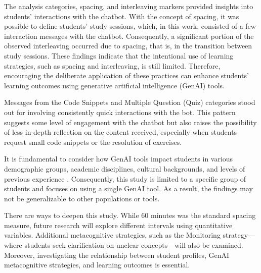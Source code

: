 \documentclass[a4paper,twoside]{article}
\begin{document}
The analysis categories, spacing, and interleaving markers provided insights
into students' interactions with the chatbot. With the concept of spacing, it
was possible to define students' study sessions, which, in this work, consisted
of a few interaction messages with the chatbot. Consequently, a significant
portion of the observed interleaving occurred due to spacing, that is, in the
transition between study sessions. These findings indicate that the intentional
use of learning strategies, such as spacing and interleaving, is still limited.
Therefore, encouraging the deliberate application of these practices can enhance
students' learning outcomes using generative artificial intelligence (GenAI)
tools.

Messages from the Code Snippets and Multiple Question (Quiz) categories stood
out for involving consistently quick interactions with the bot. This pattern
suggests some level of engagement with the chatbot but also raises the
possibility of less in-depth reflection on the content received, especially when
students request small code snippets or the resolution of exercises.

It is fundamental to consider how GenAI tools impact students in various
demographic groups, academic disciplines, cultural backgrounds, and levels of
previous experience \citep{catalan21} \citep{neo22}. Consequently, this study is
limited to a specific group of students and focuses on using a single GenAI
tool. As a result, the findings may not be generalizable to other populations or
tools.

There are ways to deepen this study. While 60 minutes was the standard spacing
measure, future research will explore different intervals using quantitative
variables. Additional metacognitive strategies, such as the Monitoring
strategy—where students seek clarification on unclear concepts—will also be
examined. Moreover, investigating the relationship between student profiles,
GenAI metacognitive strategies, and learning outcomes is essential.


{\small
}
\end{document}
